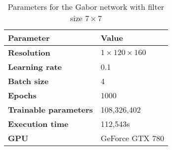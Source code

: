 \begin{table}[h!]
	\footnotesize
	\centering
	\begin{tabular}{ll}
	\hline
		\textbf{Parameter} & \textbf{Value}\\
	\hline
	\hline
		\textbf{Resolution} & $1 \times 120\times160$\\
		\textbf{Learning rate} & 0.1\\
		\textbf{Batch size} & 4\\
		\textbf{Epochs} & 1000\\
		\textbf{Trainable parameters} & 108,326,402\\
		\textbf{Execution time} & 112,543s\\
		\textbf{GPU} & GeForce GTX 780\\
	\hline
	\end{tabular}
	\caption{Parameters for the Gabor network with filter size $7\times7$}
	\label{tab:gabor_params_largerconv}
\end{table}
